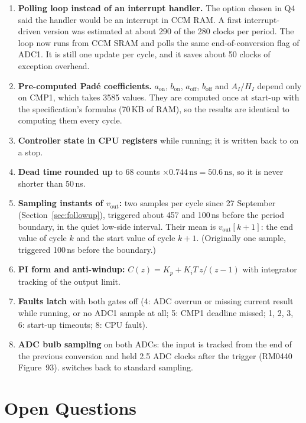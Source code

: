 \documentclass[11pt]{article}
\newcommand{\code}[1]{\texttt{\detokenize{#1}}}
\begin{document}
\begin{enumerate}[label=C\arabic*., leftmargin=2.5em]
\item \textbf{Polling loop instead of an interrupt handler.} The option
chosen in Q4 said the handler would be an interrupt in CCM RAM. A first
interrupt-driven version was estimated at about 290 of the 280 clocks
per period. The loop now runs from CCM SRAM and polls the same
end-of-conversion flag of ADC1. It is still one update per cycle, and it
saves about 50 clocks of exception overhead.
\item \textbf{Pre-computed Pad\'e coefficients.} $a_{\mathrm{on}}$,
$b_{\mathrm{on}}$, $a_{\mathrm{off}}$, $b_{\mathrm{off}}$ and
$A_I/H_I$ depend only on CMP1, which takes 3585 values. They are
computed once at start-up with the specification's formulas (70\,KB
of RAM), so the results are identical to computing them every cycle.
\item \textbf{Controller state in CPU registers} while running; it is
written back to \code{g_buck.st} on a stop.
\item \textbf{Dead time rounded up} to 68 counts $\times 0.744\,\mathrm{ns}
= 50.6\,\mathrm{ns}$, so it is never shorter than 50\,ns.
\item \textbf{Sampling instants of $v_{\mathrm{out}}$:} two samples
per cycle since 27 September (Section~\ref{sec:followup}), triggered
about 457 and 100\,ns before the period boundary, in the quiet
low-side interval. Their mean is $v_{\mathrm{out}}[k+1]$: the end
value of cycle $k$ and the start value of cycle $k+1$. (Originally
one sample, triggered 100\,ns before the boundary.)
\item \textbf{PI form and anti-windup:}
$C(z)=K_p+K_iT\,z/(z-1)$ with integrator tracking of the output limit.
\item \textbf{Faults latch} with both gates off (4: ADC overrun or
missing current result while running, or no ADC1 sample at all;
5: CMP1 deadline missed; 1, 2, 3, 6: start-up
timeouts; 8: CPU fault).
\item \textbf{ADC bulb sampling} on both ADCs: the input is tracked
from the end of the previous conversion and held 2.5 ADC clocks after
the trigger (RM0440 Figure~93).
\code{-DBUCK_ADC_BULB=0} switches back to standard sampling.
\end{enumerate}

\section{Open Questions}
\label{sec:open}
\end{document}
